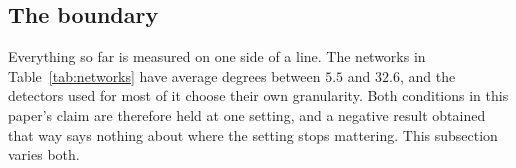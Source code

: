 %

\subsection{The boundary}\label{sec:experiments:boundary}

Everything so far is measured on one side of a line. The networks in
Table~\ref{tab:networks} have average degrees between $5.5$ and $32.6$, and the
detectors used for most of it choose their own granularity. Both conditions in
this paper's claim are therefore held at one setting, and a negative result
obtained that way says nothing about where the setting stops mattering. This
subsection varies both.

